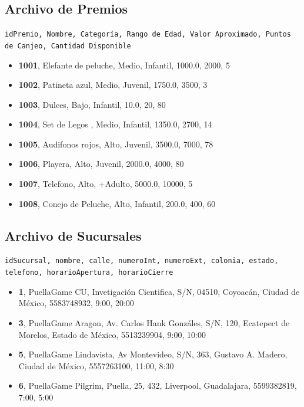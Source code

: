 \documentclass{article}
\begin{document}
\subsection*{Archivo de Premios}
\texttt{idPremio, Nombre, Categoría, Rango de Edad, Valor Aproximado, Puntos de Canjeo, Cantidad Disponible}
\begin{itemize}
    \item \textbf{1001}, Elefante de peluche, Medio, Infantil, 1000.0, 2000, 5
    \item \textbf{1002}, Patineta azul, Medio, Juvenil, 1750.0, 3500, 3
    \item \textbf{1003}, Dulces, Bajo, Infantil, 10.0, 20, 80
    \item \textbf{1004}, Set de Legos , Medio, Infantil, 1350.0, 2700, 14
    \item \textbf{1005}, Audifonos rojos, Alto, Juvenil, 3500.0, 7000, 78
    \item \textbf{1006}, Playera, Alto, Juvenil, 2000.0, 4000, 80
    \item \textbf{1007}, Telefono, Alto, +Adulto, 5000.0, 10000, 5
    \item \textbf{1008}, Conejo de Peluche, Alto, Infantil, 200.0, 400, 60
\end{itemize}

\subsection*{Archivo de Sucursales}
\texttt{idSucursal, nombre, calle, numeroInt, numeroExt, colonia, estado, telefono, horarioApertura, horarioCierre}
\begin{itemize}
    \item \textbf{1}, PuellaGame CU, Invetigación Cientifica, S/N, 04510, Coyoacán, Ciudad de México, 5583748932, 9:00, 20:00
    \item \textbf{3}, PuellaGame Aragon, Av. Carlos Hank Gonzáles, S/N, 120, Ecatepect de Morelos, Estado de México, 5513239904, 9:00, 10:00
    \item \textbf{5}, PuellaGame Lindavista, Av Montevideo, S/N, 363, Gustavo A. Madero, Ciudad de México, 5557263100, 11:00, 8:30
    \item \textbf{6}, PuellaGame Pilgrim, Puella, 25, 432, Liverpool, Guadalajara, 5599382819, 7:00, 5:00
\end{itemize}
\end{document}
